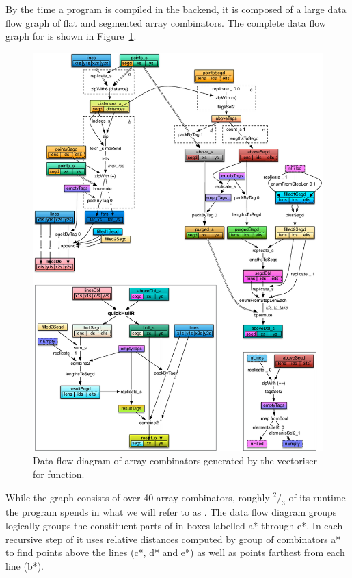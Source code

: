 \documentclass[preamble.tex]{subfiles}
\begin{document}
By the time a \DPH program is compiled in the backend, it is composed of a large data flow graph of flat and segmented array combinators. The complete data flow graph for \QuickHull is shown in Figure~\ref{fig:DFD-QuickHull}.


\begin{figure}
\includegraphics[width=1.1\textwidth, center]{img/DFD-QuickHull}
\caption{Data flow diagram of array combinators generated by the vectoriser for  function.}
\label{fig:DFD-QuickHull}
\end{figure}


While the graph consists of over 40 array combinators, roughly $^2/_3$ of its runtime the \QuickHull program spends in what we will refer to as . The data flow diagram groups logically groups the constituent parts of \FilterMax in boxes labelled \*a* through \*e*. In each recursive step of \QuickHull it uses relative distances computed by group of combinators \*a* to find points above the lines (\*c*, \*d* and \*e*) as well as points farthest from each line (\*b*).
\end{document}
